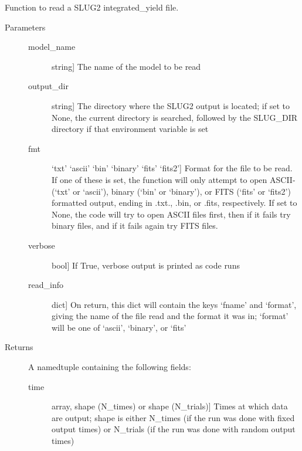 \documentclass[letterpaper,10pt,english]{sphinxmanual}
\begin{document}
\begin{fulllineitems}
\label{slugpy:slugpy.read_integrated_yield}
Function to read a SLUG2 integrated\_yield file.
\begin{description}
\item[{Parameters}] \leavevmode\begin{description}
\item[{model\_name}] \leavevmode{[}string{]}
The name of the model to be read

\item[{output\_dir}] \leavevmode{[}string{]}
The directory where the SLUG2 output is located; if set to None,
the current directory is searched, followed by the SLUG\_DIR
directory if that environment variable is set

\item[{fmt}] \leavevmode{[}`txt' \textbar{} `ascii' \textbar{} `bin' \textbar{} `binary' \textbar{} `fits' \textbar{} `fits2'{]}
Format for the file to be read. If one of these is set, the
function will only attempt to open ASCII-(`txt' or `ascii'), 
binary (`bin' or `binary'), or FITS (`fits' or `fits2')
formatted output, ending in .txt., .bin, or .fits,
respectively. If set to None, the code will try to open
ASCII files first, then if it fails try binary files, and if
it fails again try FITS files.

\item[{verbose}] \leavevmode{[}bool{]}
If True, verbose output is printed as code runs

\item[{read\_info}] \leavevmode{[}dict{]}
On return, this dict will contain the keys `fname' and
`format', giving the name of the file read and the format it
was in; `format' will be one of `ascii', `binary', or `fits'

\end{description}

\item[{Returns}] \leavevmode
A namedtuple containing the following fields:
\begin{description}
\item[{time}] \leavevmode{[}array, shape (N\_times) or shape (N\_trials){]}
Times at which data are output; shape is either N\_times (if
the run was done with fixed output times) or N\_trials (if
the run was done with random output times)


\end{description}
\end{description}
\end{fulllineitems}
\end{document}
